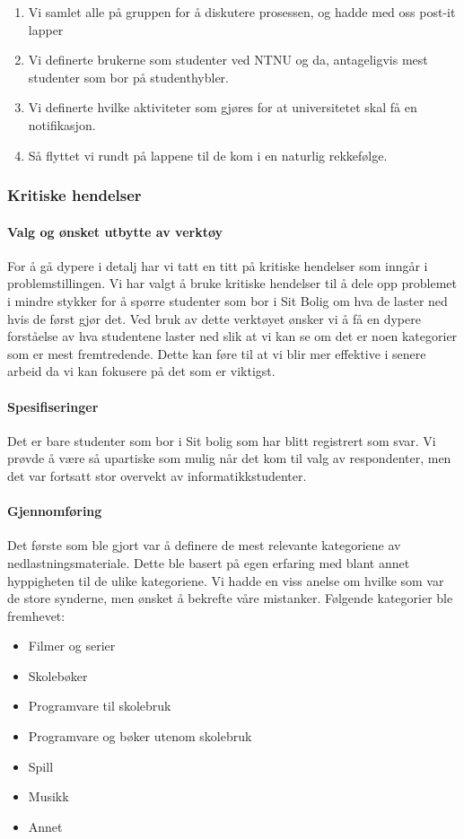 \begin{enumerate}
    \item Vi samlet alle på gruppen for å diskutere prosessen, og hadde med oss post-it lapper
    \item Vi definerte brukerne som studenter ved NTNU og da, antageligvis mest studenter som bor på studenthybler.
    \item Vi definerte hvilke aktiviteter som gjøres for at universitetet skal få en notifikasjon.
    \item Så flyttet vi rundt på lappene til de kom i en naturlig rekkefølge.
\end{enumerate}

\subsubsection{Kritiske hendelser}

\paragraph{Valg og ønsket utbytte av verktøy}
For å gå dypere i detalj har vi tatt en titt på kritiske hendelser som inngår i problemstillingen. Vi har valgt å bruke kritiske hendelser til å dele opp problemet i mindre stykker for å spørre studenter som bor i Sit Bolig om hva de laster ned hvis de først gjør det. Ved bruk av dette verktøyet ønsker vi å få en dypere forståelse av hva studentene laster ned slik at vi kan se om det er noen kategorier som er mest fremtredende. Dette kan føre til at vi blir mer effektive i senere arbeid da vi kan fokusere på det som er viktigst.

\paragraph{Spesifiseringer}
Det er bare studenter som bor i Sit bolig som har blitt registrert som svar. Vi prøvde å være så upartiske som mulig når det kom til valg av respondenter, men det var fortsatt stor overvekt av informatikkstudenter.

\paragraph{Gjennomføring}
Det første som ble gjort var å definere de mest relevante kategoriene av nedlastningsmateriale. Dette ble basert på egen erfaring med blant annet hyppigheten til de ulike kategoriene. Vi hadde en viss anelse om hvilke som var de store synderne, men ønsket å bekrefte våre mistanker. Følgende kategorier ble fremhevet: 
\begin{itemize}
    \item Filmer og serier
    \item Skolebøker
    \item Programvare til skolebruk
    \item Programvare og bøker utenom skolebruk
    \item Spill
    \item Musikk
    \item Annet
\end{itemize}

